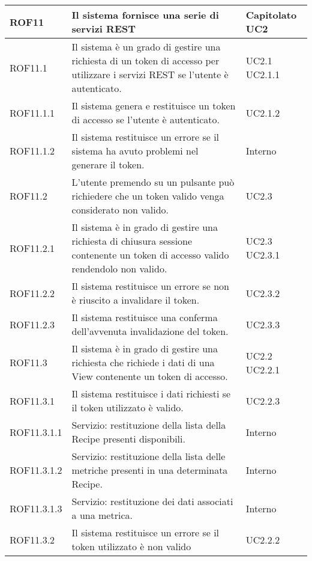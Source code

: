 \begin{center}
\begin{longtable}{| p{2.5cm} | p{8cm} | p{2cm} |}

		ROF11  &  Il sistema fornisce una serie di servizi REST  & Capitolato \newline UC2 \\
		\hline
		ROF11.1  &  Il sistema è un grado di gestire una richiesta di un token di accesso per utilizzare i servizi REST se l'utente è autenticato.  & UC2.1 \newline UC2.1.1 \\
		\hline
		ROF11.1.1  &  Il sistema genera e restituisce un token di accesso se l'utente è autenticato. & UC2.1.2 \\
		\hline
		ROF11.1.2  &  Il sistema restituisce un errore se il sistema ha avuto problemi nel generare il token. & Interno \\
		\hline
		ROF11.2  &  L'utente premendo su un pulsante può richiedere che un token valido venga considerato non valido.  & UC2.3  \\
		\hline
		ROF11.2.1  &  Il sistema è in grado di gestire una richiesta di chiusura sessione contenente un token di accesso valido rendendolo non valido. & UC2.3 \newline UC2.3.1 \\
		\hline
		ROF11.2.2  &  Il sistema restituisce un errore se non è riuscito a invalidare il token. & UC2.3.2 \\
		\hline
		ROF11.2.3  &  Il sistema restituisce una conferma dell'avvenuta invalidazione del token. & UC2.3.3 \\
		\hline
		ROF11.3  &  Il sistema è in grado di gestire una richiesta che richiede i dati di una View contenente un token di accesso.  &  UC2.2 \newline UC2.2.1 \\
		\hline
		ROF11.3.1  &  Il sistema restituisce i dati richiesti se il token utilizzato è valido.  &  UC2.2.3 \\
		\hline
		ROF11.3.1.1 & Servizio: restituzione della lista della Recipe presenti disponibili. & Interno \\
		\hline
		ROF11.3.1.2 & Servizio: restituzione della lista delle metriche presenti in una determinata Recipe. & Interno \\
		\hline
		ROF11.3.1.3 & Servizio: restituzione dei dati associati a una metrica. & Interno \\
		\hline
		ROF11.3.2  &  Il sistema restituisce un errore se il token utilizzato è non valido  &  UC2.2.2 \\
		\hline


\end{longtable}
\end{center}

